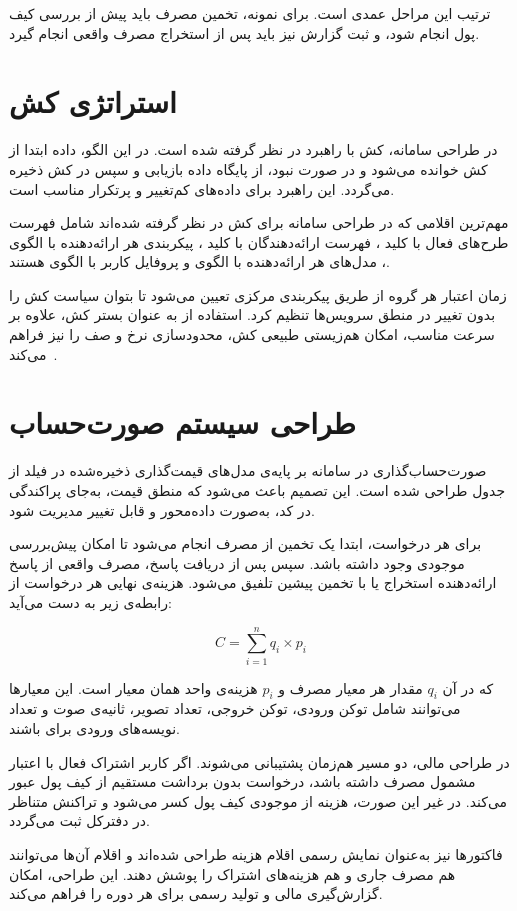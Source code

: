 ترتیب این مراحل عمدی است. برای نمونه، تخمین مصرف باید پیش از بررسی کیف
پول انجام شود، و ثبت گزارش نیز باید پس از استخراج مصرف واقعی انجام گیرد.

\section{استراتژی کش}

در طراحی سامانه، کش با راهبرد  در نظر گرفته شده
است. در این الگو، داده ابتدا از کش خوانده می‌شود و در صورت نبود، از
پایگاه داده بازیابی و سپس در کش ذخیره می‌گردد. این راهبرد برای داده‌های
کم‌تغییر و پرتکرار مناسب است.

مهم‌ترین اقلامی که در طراحی سامانه برای کش در نظر گرفته شده‌اند شامل فهرست
طرح‌های فعال با کلید ، فهرست ارائه‌دهندگان با کلید
، پیکربندی هر ارائه‌دهنده با الگوی
، مدل‌های هر ارائه‌دهنده با الگوی
 و پروفایل کاربر با الگوی
 هستند.

زمان اعتبار هر گروه از طریق پیکربندی مرکزی تعیین می‌شود تا بتوان سیاست
کش را بدون تغییر در منطق سرویس‌ها تنظیم کرد. استفاده از  به
عنوان بستر کش، علاوه بر سرعت مناسب، امکان هم‌زیستی طبیعی کش، محدودسازی
نرخ و صف را نیز فراهم می‌کند~\cite{redis2024}.

\section{طراحی سیستم صورت‌حساب}

صورت‌حساب‌گذاری در سامانه بر پایه‌ی مدل‌های قیمت‌گذاری ذخیره‌شده در
فیلد  از جدول  طراحی شده است.
این تصمیم باعث می‌شود که منطق قیمت، به‌جای پراکندگی در کد، به‌صورت
داده‌محور و قابل تغییر مدیریت شود.

برای هر درخواست، ابتدا یک تخمین از مصرف انجام می‌شود تا امکان پیش‌بررسی
موجودی وجود داشته باشد. سپس پس از دریافت پاسخ، مصرف واقعی از پاسخ
ارائه‌دهنده استخراج یا با تخمین پیشین تلفیق می‌شود. هزینه‌ی نهایی هر
درخواست از رابطه‌ی زیر به دست می‌آید:

\[
C = \sum_{i=1}^{n} q_i \times p_i
\]

که در آن \(q_i\) مقدار هر معیار مصرف و \(p_i\) هزینه‌ی واحد همان معیار است.
این معیارها می‌توانند شامل توکن ورودی، توکن خروجی، تعداد تصویر، ثانیه‌ی
صوت و تعداد نویسه‌های ورودی برای  باشند.

در طراحی مالی، دو مسیر هم‌زمان پشتیبانی می‌شوند. اگر کاربر اشتراک فعال با
اعتبار مشمول مصرف داشته باشد، درخواست بدون برداشت مستقیم از کیف پول عبور
می‌کند. در غیر این صورت، هزینه از موجودی کیف پول کسر می‌شود و تراکنش
متناظر در دفترکل ثبت می‌گردد.

فاکتورها نیز به‌عنوان نمایش رسمی اقلام هزینه طراحی شده‌اند و اقلام آن‌ها
می‌توانند هم مصرف جاری و هم هزینه‌های اشتراک را پوشش دهند. این طراحی،
امکان گزارش‌گیری مالی و تولید  رسمی برای هر دوره را فراهم می‌کند.
